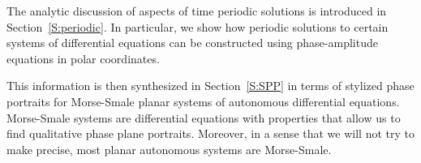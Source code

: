 \documentclass{ximera}
\begin{document}
The analytic discussion of aspects of time periodic solutions is introduced 
in Section~\ref{S:periodic}.  In particular, we show how 
periodic solutions to certain systems of differential equations can be 
constructed using phase-amplitude equations in polar coordinates.

This information is then synthesized in Section~\ref{S:SPP} in terms of 
stylized phase portraits for Morse-Smale planar systems of autonomous 
differential equations.  Morse-Smale systems are differential equations with 
properties that allow us to find qualitative phase plane portraits.  
Moreover, in a sense that we will not try to make precise, most planar 
autonomous systems are Morse-Smale.  
\end{document}
